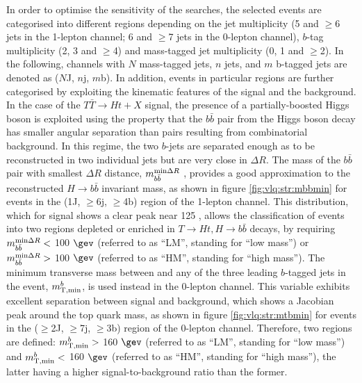 In order to optimise the sensitivity of the searches, the selected events are categorised into different regions depending on the jet multiplicity (5 and $\ge$6 jets in the 1-lepton channel; 6 and $\ge$7 jets in the 0-lepton channel), $b$-tag multiplicity (2, 3 and $\ge$4) and mass-tagged jet multiplicity (0, 1 and $\ge$2). In the following, channels with $N$ mass-tagged jets, $n$ jets, and $m$ b-tagged jets are denoted as ($N$J, $n$j, $m$b). In addition, events in particular regions are further categorised by exploiting the kinematic features of the signal and the background. In the case of the $T\bar{T}\to Ht+X$ signal, the presence of a partially-boosted Higgs boson is exploited using the property that the $b\bar{b}$ pair from the Higgs boson decay has smaller angular separation than pairs resulting from combinatorial background. In this regime, the two $b$-jets are separated enough as to be reconstructed in two individual jets but are very close in $\Delta R$. The mass of the $b\bar{b}$ pair with smallest $\Delta R$ distance, $m_{b\bar{b}}^{{\rm min}\Delta R}$ , provides a good approximation to the reconstructed $H \to b\bar{b}$ invariant mass, as shown in figure \ref{fig:vlq:str:mbbmin} for events in the (1J, $\ge$6j, $\ge$4b) region of the 1-lepton channel.
This distribution, which for signal shows a clear peak near 125 \gev, allows the classification of events into two regions depleted or enriched in $T\to Ht,H\to b\bar{b}$ decays, by requiring $m_{b\bar{b}}^{{\rm min}\Delta R}<$ 100 $\gev$ (referred to as ``LM'', standing for ``low mass'') or $m_{b\bar{b}}^{{\rm min}\Delta R}>$  100 $\gev$ (referred to as ``HM'', standing for ``high mass''). 
The minimum transverse mass between \MET and any of the three leading $b$-tagged jets in the event, $m_{\rm T,min}^b$, is used instead in the 0-lepton channel. This variable exhibits excellent separation between signal and background, which shows a Jacobian peak around the top quark mass, as shown in figure \ref{fig:vlq:str:mtbmin} for events in the ($\ge$2J, $\ge$7j, $\ge$3b) region of the 0-lepton channel. Therefore, two regions are defined: $m_{\rm T,min}^b>$ 160 $\gev$ (referred to as ``LM'', standing for ``low mass'') and $m_{\rm T,min}^b<$ 160 $\gev$ (referred to as ``HM'', standing for ``high mass''), the latter having a higher signal-to-background ratio than the former.


